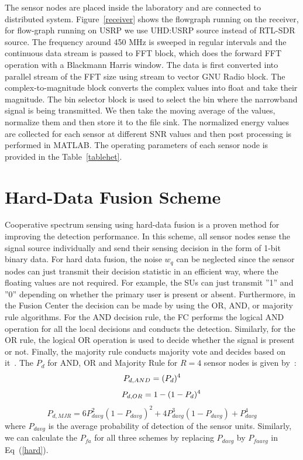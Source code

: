 The sensor nodes are placed inside the laboratory and are connected to distributed system. Figure~\ref{receiver} shows the flowgraph running on the receiver, for flow-graph running on USRP we use UHD:USRP source instead of RTL-SDR source. The frequency around 450 MHz is sweeped in regular intervals and the continuous data stream is passed to FFT block, which does the forward FFT operation with a Blackmann Harris window. The data is first converted into parallel stream of the FFT size using stream to vector GNU Radio block. The complex-to-magnitude block converts the complex values into float and take their magnitude. The bin selector block is used to select the bin where the narrowband signal is being transmitted. We then take the moving average of the values, normalize them and then store it to the file sink. The normalized energy values are collected for each sensor at different SNR values and then post processing is performed in MATLAB. The operating parameters of each sensor node is provided in the Table~\ref{tablehet}.

\section{Hard-Data Fusion Scheme}
\label{hardfusion}
Cooperative spectrum sensing using hard-data fusion is a proven method for improving the detection performance. In this scheme, all sensor nodes sense the signal source individually and send their sensing decision in the form of 1-bit binary data. For hard data fusion, the noise $w_q$ can be neglected since the sensor nodes can just transmit their decision statistic in an efficient way, where the floating values are not required. For example, the SUs can just transmit ''1'' and ''0'' depending on whether the primary user is present or absent. Furthermore, in the Fusion Center the decision can be made by using the OR, AND, or majority rule algorithms. For the AND decision rule, the FC performs the logical AND operation for all the local decisions and conducts the detection. Similarly, for the OR rule, the logical OR operation is used to decide whether the signal is present or not. Finally, the majority rule conducts majority vote and decides based on it~\cite{ghasemi2005collaborative,duan2010performance}. The $P_d$ for AND, OR and Majority Rule for $R=4$ sensor nodes is given by~\cite{inphtn15}:
\begin{equation}
P_{d,AND} = (P_d)^4\nonumber\\
\vspace{-15pt}
\end{equation}
\begin{equation}
\label{hard}
~~~~~~~P_{d,OR} = 1-(1-P_d)^4
\vspace{-15pt}
\end{equation}
\begin{equation}
P_{d,MJR} = 6P_{davg}^2(1-P_{davg})^2+4P_{davg}^3(1-P_{davg})+P_{davg}^4\nonumber
\end{equation}
where $P_{davg}$ is the average probability of detection of the sensor units. Similarly, we can calculate the $P_{fa}$ for all three schemes by replacing $P_{davg}$ by $P_{faavg}$ in Eq~(\ref{hard}).

